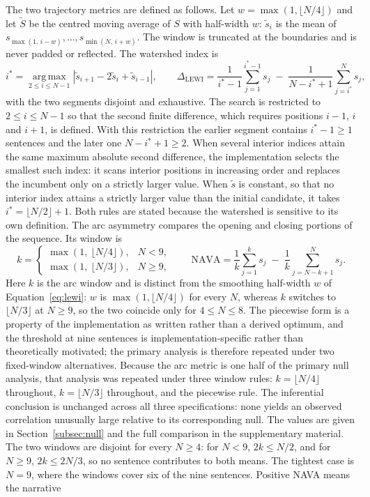 \documentclass[fleqn,10pt]{wlscirep}
\begin{document}
The two trajectory metrics are defined as follows. Let $w=\max(1,\lfloor N/4 \rfloor)$ and let $\tilde S$ be the centred moving
average of $S$ with half-width $w$: $\tilde s_i$ is the mean of
$s_{\max(1,\,i-w)}, \dots, s_{\min(N,\,i+w)}$. The window is truncated at the
boundaries and is never padded or reflected. The watershed index is
\begin{equation}
i^{*} = \operatorname*{arg\,max}_{2 \le i \le N-1}
\left| \tilde s_{i+1} - 2\tilde s_i + \tilde s_{i-1} \right|,
\qquad
\Delta_{\mathrm{LEWI}} = \frac{1}{i^{*}-1}\sum_{j=1}^{i^{*}-1} s_j
\; - \; \frac{1}{N-i^{*}+1}\sum_{j=i^{*}}^{N} s_j ,
\label{eq:lewi}
\end{equation}
with the two segments disjoint and exhaustive. The search is restricted to $2 \le i \le N-1$ so that the second finite difference, which requires positions $i-1$, $i$ and $i+1$, is defined. With this restriction the earlier segment contains $i^{*}-1 \ge 1$ sentences and the later one $N-i^{*}+1 \ge 2$.
When several interior indices attain the same maximum absolute second
difference, the implementation selects the smallest such index: it scans
interior positions in increasing order and replaces the incumbent only on a
strictly larger value. When $\tilde s$ is constant, so that no interior index
attains a strictly larger value than the initial candidate, it takes
$i^{*} = \lfloor N/2 \rfloor + 1$. Both rules are stated because the watershed
is sensitive to its own definition.
The arc asymmetry compares the opening and closing portions of the sequence.
Its window is
\begin{equation}
k = \begin{cases}
\max\!\left(1,\ \lfloor N/4 \rfloor\right), & N < 9,\\[2pt]
\max\!\left(1,\ \lfloor N/3 \rfloor\right), & N \ge 9,
\end{cases}
\qquad
\mathrm{NAVA} = \frac{1}{k}\sum_{j=1}^{k} s_j \; - \; \frac{1}{k}\sum_{j=N-k+1}^{N} s_j .
\label{eq:nava}
\end{equation}
Here $k$ is the arc window and is distinct from the smoothing half-width $w$ of Equation~\eqref{eq:lewi}: $w$ is $\max(1,\lfloor N/4 \rfloor)$ for every $N$, whereas $k$ switches to $\lfloor N/3 \rfloor$ at $N \ge 9$, so the two coincide only for $4 \le N \le 8$. The piecewise form is a property of the implementation as written rather than a derived optimum, and the threshold at nine sentences is implementation-specific rather than theoretically motivated; the primary analysis is therefore repeated under two fixed-window alternatives. Because the arc metric is one half of the primary null analysis, that analysis was repeated under three window rules: $k=\lfloor N/4 \rfloor$ throughout, $k=\lfloor N/3 \rfloor$ throughout, and the piecewise rule. The inferential conclusion is unchanged across all three specifications: none yields an observed correlation unusually large relative to its corresponding null. The values are given in Section~\ref{subsec:null} and the full comparison in the supplementary material. The two windows are disjoint for every $N \ge 4$: for $N<9$, $2k \le N/2$, and for $N \ge 9$, $2k \le 2N/3$, so no sentence contributes to both means. The tightest case is $N=9$, where the windows cover six of the nine sentences. Positive NAVA means the narrative
\end{document}
